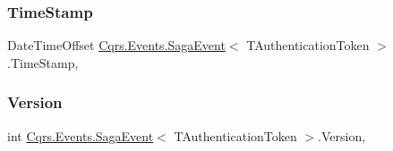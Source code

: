 \subsubsection{\texorpdfstring{Time\+Stamp}{TimeStamp}}
{\footnotesize\ttfamily Date\+Time\+Offset \hyperlink{classCqrs_1_1Events_1_1SagaEvent}{Cqrs.\+Events.\+Saga\+Event}$<$ T\+Authentication\+Token $>$.Time\+Stamp\hspace{0.3cm}{\ttfamily [get]}, {\ttfamily [set]}}

\mbox{\label{classCqrs_1_1Events_1_1SagaEvent_a4918d2e0a66897600143f1e645a0f136}} 
\subsubsection{\texorpdfstring{Version}{Version}}
{\footnotesize\ttfamily int \hyperlink{classCqrs_1_1Events_1_1SagaEvent}{Cqrs.\+Events.\+Saga\+Event}$<$ T\+Authentication\+Token $>$.Version\hspace{0.3cm}{\ttfamily [get]}, {\ttfamily [set]}}

